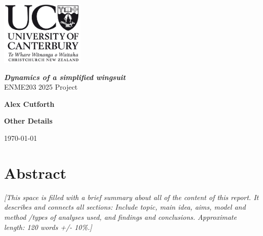\documentclass[11pt]{article}
\begin{document}
\begin{titlepage}
\hfill\includegraphics[width=40mm]{UCLogo.png}
\begin{center}

\vspace*{\fill}

\textbf{\huge{\textsl{Dynamics of a simplified wingsuit}}}\\
ENME203 2025 Project\\
\vspace*{\fill}


\textbf{\large Alex Cutforth}

\textbf{\large Other Details}

\vspace*{\fill}

\textnormal{\large \today}

\end{center}
\end{titlepage}

\section*{Abstract}
\textcolor[rgb]{0.80,0.29,0.09}{\textsl{[This space is filled with a brief summary about all of the content of this report. It describes and connects all sections: Include topic, main idea, aims, model and method /types of analyses used, and findings and conclusions. Approximate length: 120 words +/- 10\%.]}}


\end{document}
